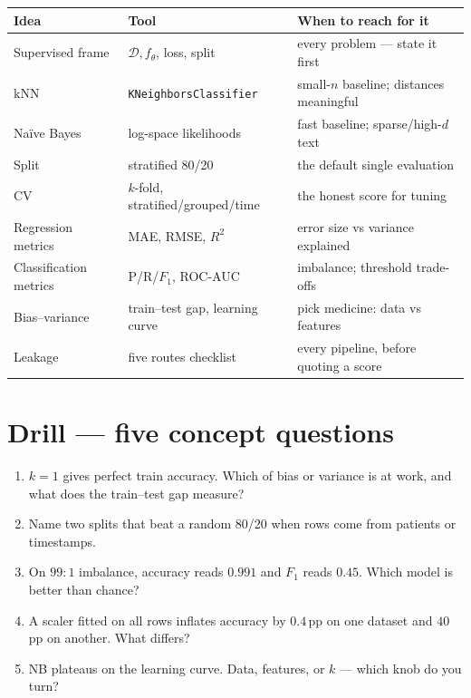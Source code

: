 \begin{tabularx}{\linewidth}{@{}l l X@{}}
\toprule
\textbf{Idea} & \textbf{Tool} & \textbf{When to reach for it}\\
\midrule
Supervised frame & $\mathcal D, f_\theta$, loss, split & every problem --- state it first\\
kNN & \texttt{KNeighborsClassifier} & small-$n$ baseline; distances meaningful\\
Na\"ive Bayes & log-space likelihoods & fast baseline; sparse/high-$d$ text\\
Split & stratified 80/20 & the default single evaluation\\
CV & $k$-fold, stratified/grouped/time & the honest score for tuning\\
Regression metrics & MAE, RMSE, $R^2$ & error size vs variance explained\\
Classification metrics & P/R/$F_1$, ROC-AUC & imbalance; threshold trade-offs\\
Bias--variance & train--test gap, learning curve & pick medicine: data vs features\\
Leakage & five routes checklist & every pipeline, before quoting a score\\
\bottomrule
\end{tabularx}

\section{Drill --- five concept questions}

\begin{enumerate}
\item $k{=}1$ gives perfect train accuracy. Which of bias or variance is
  at work, and what does the train--test gap measure?
\item Name two splits that beat a random 80/20 when rows come from
  patients or timestamps.
\item On $99{:}1$ imbalance, accuracy reads $0.991$ and $F_1$ reads
  $0.45$. Which model is better than chance?
\item A scaler fitted on all rows inflates accuracy by $0.4$\,pp on one
  dataset and $40$\,pp on another. What differs?
\item NB plateaus on the learning curve. Data, features, or $k$ --- which
  knob do you turn?
\end{enumerate}

